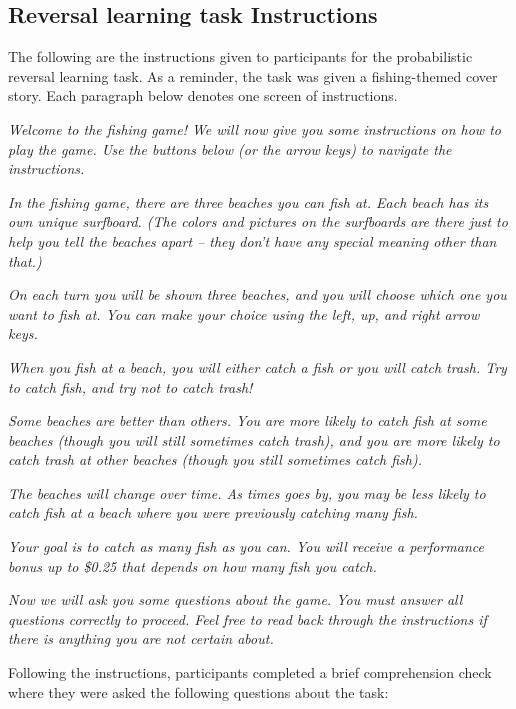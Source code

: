 \documentclass[a4paper,notitlepage,12pt]{article}
\begin{document}
\clearpage
{}
\subsection*{Reversal learning task Instructions}

The following are the instructions given to participants for the probabilistic reversal learning task. As a reminder, the task was given a fishing-themed cover story. Each paragraph below denotes one screen of instructions.

\textit{Welcome to the fishing game! We will now give you some instructions on how to play the game. Use the buttons below (or the arrow keys) to navigate the instructions.}

\textit{In the fishing game, there are three beaches you can fish at. Each beach has its own unique surfboard. (The colors and pictures on the surfboards are there just to help you tell the beaches apart – they don’t have any special meaning other than that.)}

\textit{On each turn you will be shown three beaches, and you will choose which one you want to fish at. You can make your choice using the left, up, and right arrow keys.}

\textit{When you fish at a beach, you will either catch a fish or you will catch trash. Try to catch fish, and try not to catch trash!}

\textit{Some beaches are better than others. You are more likely to catch fish at some beaches (though you will still sometimes catch trash), and you are more likely to catch trash at other beaches (though you still sometimes catch fish).}

\textit{The beaches will change over time. As times goes by, you may be less likely to catch fish at a beach where you were previously catching many fish.}

\textit{Your goal is to catch as many fish as you can. You will receive a performance bonus up to \$0.25 that depends on how many fish you catch.}

\textit{Now we will ask you some questions about the game. You must answer all questions correctly to proceed. Feel free to read back through the instructions if there is anything you are not certain about.}

Following the instructions, participants completed a brief comprehension check where they were asked the following questions about the task:
\end{document}
